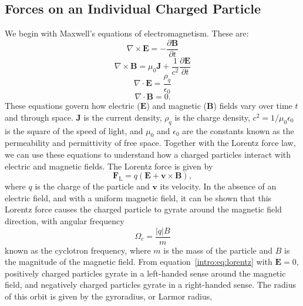 \subsection{Forces on an Individual Charged Particle}\label{intro:sec:singleparticle}
We begin with Maxwell's equations of electromagnetism. These are:
\begin{equation}
\nabla \times \boldsymbol{E} = -\frac{\partial \boldsymbol{B}}{\partial t}
\end{equation}
\begin{equation}\label{intro:eq:amperemaxwell}
\nabla \times \boldsymbol{B} = \mu_0 \boldsymbol{J} + \frac{1}{c^2}\frac{\partial \boldsymbol{E}}{\partial t}
\end{equation}
\begin{equation}
\nabla \cdot \boldsymbol{E} = \frac{\rho_q}{\epsilon_0} 
\end{equation}
\begin{equation}\label{intro:eq:nomonopoles}
\nabla \cdot \boldsymbol{B} = 0.
\end{equation}
These equations govern how electric ($\boldsymbol{E}$) and magnetic ($\boldsymbol{B}$) fields vary over time $t$ and through space. $\boldsymbol{J}$ is the current density, $\rho_q$ is the charge density, $c^2 = 1/\mu_0 \epsilon_0$ is the square of the speed of light, and $\mu_0$ and $\epsilon_0$ are the constants known as the permeability and permittivity of free space. Together with the Lorentz force law, we can use these equations to understand how a charged particles interact with electric and magnetic fields. The Lorentz force is given by 
\begin{equation}\label{intro:eq:lorentz}
\boldsymbol{F}_\mathrm{L} = q(\boldsymbol{E} + \boldsymbol{v} \times \boldsymbol{B}),
\end{equation}
where $q$ is the charge of the particle and $\boldsymbol{v}$ its velocity. In the absence of an electric field, and with a uniform magnetic field, it can be shown that this Lorentz force causes the charged particle to gyrate around the magnetic field direction, with angular frequency
\begin{equation}
\Omega_c = \frac{|q|B}{m}
\end{equation}
known as the cyclotron frequency, where $m$ is the mass of the particle and $B$ is the magnitude of the magnetic field. From equation~\ref{intro:eq:lorentz}  with $\boldsymbol{E}=0$, positively charged particles gyrate in a left-handed sense around the magnetic field, and negatively charged particles gyrate in a right-handed sense. The radius of this orbit is given by the gyroradius, or Larmor radius,
